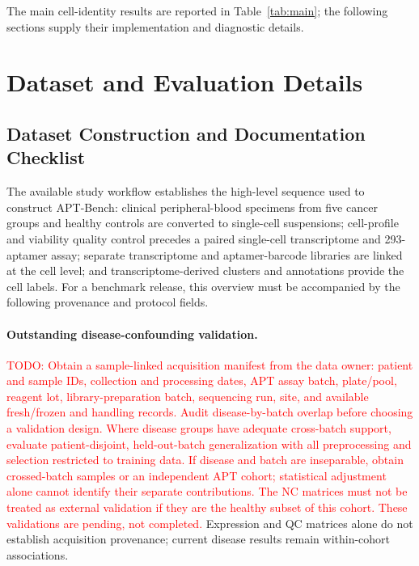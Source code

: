\documentclass{article} %
\newcommand{\todo}[1]{\textcolor{red}{TODO: #1}}
\begin{document}
The main cell-identity results are reported in Table~\ref{tab:main}; the
following sections supply their implementation and diagnostic details.

\section{Dataset and Evaluation Details}

\subsection{Dataset Construction and Documentation Checklist}
\label{sec:appendix:dataset_documentation}

The available study workflow establishes the high-level sequence used to construct
APT-Bench: clinical peripheral-blood specimens from five cancer groups and healthy
controls are converted to single-cell suspensions; cell-profile and viability quality
control precedes a paired single-cell transcriptome and 293-aptamer assay; separate
transcriptome and aptamer-barcode libraries are linked at the cell level; and
transcriptome-derived clusters and annotations provide the cell labels. For a
benchmark release, this overview must be accompanied by the following provenance
and protocol fields.

\paragraph{Outstanding disease-confounding validation.}
\todo{Obtain a sample-linked acquisition manifest from the data owner: patient
and sample IDs, collection and processing dates, APT assay batch, plate/pool,
reagent lot, library-preparation batch, sequencing run, site, and available
fresh/frozen and handling records. Audit disease-by-batch overlap before
choosing a validation design. Where disease groups have adequate cross-batch
support, evaluate patient-disjoint, held-out-batch generalization with all
preprocessing and selection restricted to training data. If disease and batch
are inseparable, obtain crossed-batch samples or an independent APT cohort;
statistical adjustment alone cannot identify their separate contributions.
The NC matrices must not be treated as external validation if they are the
healthy subset of this cohort. These validations are pending, not completed.}
Expression and QC matrices alone do not establish acquisition provenance;
current disease results remain within-cohort associations.
\end{document}
